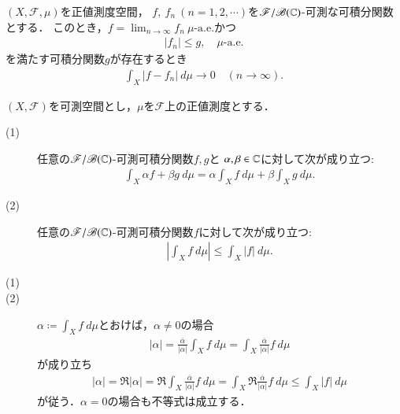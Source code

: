 	\begin{screen}
		\begin{thm}[Lebesgueの収束定理]
			$(X,\mathscr{F},\mu)$を正値測度空間，
			$f,\ f_n\ (n=1,2,\cdots)$を$\mathscr{F}/\mathscr{B}(\mathbb{C})$-可測な可積分関数とする．
			このとき，$f = \lim_{n \to \infty} f_n\ \mbox{$\mu$-a.e.}$かつ
			\begin{align}
				|f_n| \leq g, \quad \mbox{$\mu$-a.e.}
			\end{align}
			を満たす可積分関数$g$が存在するとき
			\begin{align}
				\int_X |f - f_n|\ d\mu \longrightarrow 0
				\quad (n \longrightarrow \infty).
			\end{align}
		\end{thm}
	\end{screen}
	
	\begin{screen}
		\begin{thm}
			$(X,\mathscr{F})$を可測空間とし，$\mu$を$\mathscr{F}$上の正値測度とする．
			\begin{description}
				\item[(1)] 任意の$\mathscr{F}/\mathscr{B}(\mathbb{C})$-可測可積分関数$f,g$と
					$\alpha,\beta \in \mathbb{C}$に対して次が成り立つ:
					\begin{align}
						\int_X \alpha f + \beta g\ d\mu
						= \alpha \int_X f\ d\mu + \beta \int_X g\ d\mu.
					\end{align}
					
				\item[(2)] 任意の$\mathscr{F}/\mathscr{B}(\mathbb{C})$-可測可積分関数$f$に対して次が成り立つ:
					\begin{align}
						\left| \int_X f\ d\mu \right| \leq \int_X |f|\ d\mu.
					\end{align}
			\end{description}	
		\end{thm}
	\end{screen}
	
	\begin{prf}\mbox{}
		\begin{description}
			\item[(1)] 
			
			\item[(2)]
				$\alpha \coloneqq \int_X f\ d\mu$とおけば，$\alpha \neq 0$の場合
				\begin{align}
					|\alpha|
					= \frac{\overline{\alpha}}{|\alpha|} \int_X f\ d\mu
					= \int_X \frac{\overline{\alpha}}{|\alpha|} f\ d\mu
				\end{align}
				が成り立ち
				\begin{align}
					|\alpha| = \Re{|\alpha|}
					= \Re{\int_X \frac{\overline{\alpha}}{|\alpha|} f\ d\mu}
					= \int_X \Re{\frac{\overline{\alpha}}{|\alpha|} f}\ d\mu
					\leq \int_X |f|\ d\mu
				\end{align}
				が従う．$\alpha = 0$の場合も不等式は成立する．
				\QED
		\end{description}
	\end{prf}
	
